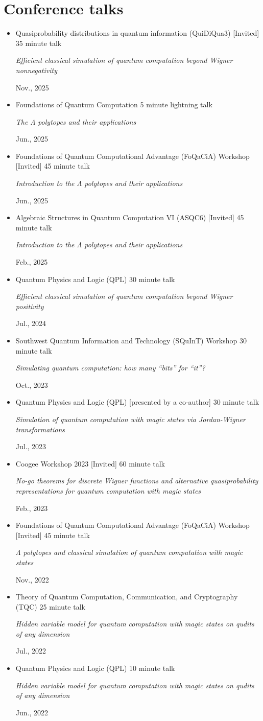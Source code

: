 \documentclass[letterpaper,11pt]{article}
\newcommand{\ConferenceItem}[4]{
	\item{\parbox{0.97\textwidth}{
		{#1} \hfill {#2}\\
		\parbox{0.86\textwidth}{\emph{#3}} \hfill {#4}
	}}
}
\begin{document}
\section*{Conference talks}
\begin{itemize}[leftmargin=*]
	\ConferenceItem{Quasiprobability distributions in quantum information (QuiDiQua3) [Invited]}{35 minute talk}{Efficient classical simulation of quantum computation beyond Wigner nonnegativity}{Nov., 2025}
	
	\ConferenceItem{Foundations of Quantum Computation}{5 minute lightning talk}{The $\Lambda$ polytopes and their applications}{Jun., 2025}
	
	\ConferenceItem{Foundations of Quantum Computational Advantage (FoQaCiA) Workshop [Invited]}{45 minute talk}{Introduction to the $\Lambda$ polytopes and their applications}{Jun., 2025}
	
	\ConferenceItem{Algebraic Structures in Quantum Computation VI (ASQC6) [Invited]}{45 minute talk}{Introduction to the $\Lambda$ polytopes and their applications}{Feb., 2025}
	
	\ConferenceItem{Quantum Physics and Logic (QPL)}{30 minute talk}{Efficient classical simulation of quantum computation beyond Wigner positivity}{Jul., 2024}
	
	\ConferenceItem{Southwest Quantum Information and Technology (SQuInT) Workshop}{30 minute talk}{Simulating quantum computation: how many ``bits'' for ``it''?}{Oct., 2023}
	
	\ConferenceItem{Quantum Physics and Logic (QPL) [presented by a co-author]}{30 minute talk}{Simulation of quantum computation with magic states via Jordan-Wigner transformations}{Jul., 2023}
	
	\ConferenceItem{Coogee Workshop 2023 [Invited]}{60 minute talk}{No-go theorems for discrete Wigner functions and alternative quasiprobability representations for quantum computation with magic states}{Feb., 2023}
	
	\ConferenceItem{Foundations of Quantum Computational Advantage (FoQaCiA) Workshop [Invited]}{45 minute talk}{$\Lambda$ polytopes and classical simulation of quantum computation with magic states}{Nov., 2022}
	
	\ConferenceItem{Theory of Quantum Computation, Communication, and Cryptography (TQC)}{25 minute talk}{Hidden variable model for quantum computation with magic states on qudits of any dimension}{Jul., 2022}
	
	\ConferenceItem{Quantum Physics and Logic (QPL)}{10 minute talk}{Hidden variable model for quantum computation with magic states on qudits of any dimension}{Jun., 2022}
	

\end{itemize}
\end{document}
